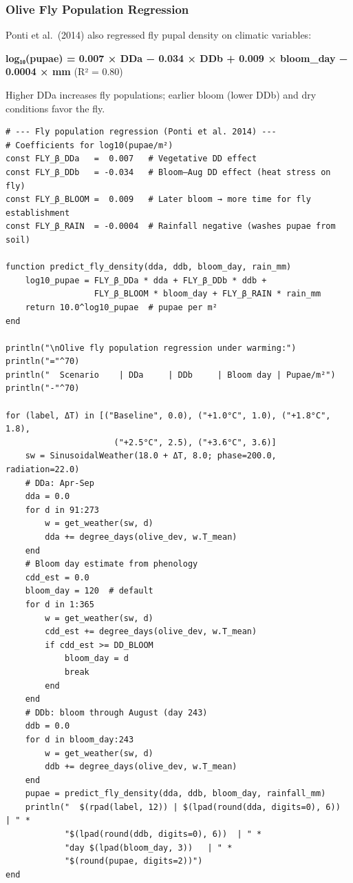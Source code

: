\subsubsection{Olive Fly Population Regression}



\label{10722401651556738282}{}


Ponti et al.~(2014) also regressed fly pupal density on climatic variables:



\textbf{log₁₀(pupae) = 0.007 × DDa − 0.034 × DDb + 0.009 × bloom\_day − 0.0004 × mm} (R² = 0.80)



Higher DDa increases fly populations; earlier bloom (lower DDb) and dry conditions favor the fly.




\begin{verbatim}
# --- Fly population regression (Ponti et al. 2014) ---
# Coefficients for log10(pupae/m²)
const FLY_β_DDa   =  0.007   # Vegetative DD effect
const FLY_β_DDb   = -0.034   # Bloom–Aug DD effect (heat stress on fly)
const FLY_β_BLOOM =  0.009   # Later bloom → more time for fly establishment
const FLY_β_RAIN  = -0.0004  # Rainfall negative (washes pupae from soil)

function predict_fly_density(dda, ddb, bloom_day, rain_mm)
    log10_pupae = FLY_β_DDa * dda + FLY_β_DDb * ddb +
                  FLY_β_BLOOM * bloom_day + FLY_β_RAIN * rain_mm
    return 10.0^log10_pupae  # pupae per m²
end

println("\nOlive fly population regression under warming:")
println("="^70)
println("  Scenario    | DDa     | DDb     | Bloom day | Pupae/m²")
println("-"^70)

for (label, ΔT) in [("Baseline", 0.0), ("+1.0°C", 1.0), ("+1.8°C", 1.8),
                      ("+2.5°C", 2.5), ("+3.6°C", 3.6)]
    sw = SinusoidalWeather(18.0 + ΔT, 8.0; phase=200.0, radiation=22.0)
    # DDa: Apr-Sep
    dda = 0.0
    for d in 91:273
        w = get_weather(sw, d)
        dda += degree_days(olive_dev, w.T_mean)
    end
    # Bloom day estimate from phenology
    cdd_est = 0.0
    bloom_day = 120  # default
    for d in 1:365
        w = get_weather(sw, d)
        cdd_est += degree_days(olive_dev, w.T_mean)
        if cdd_est >= DD_BLOOM
            bloom_day = d
            break
        end
    end
    # DDb: bloom through August (day 243)
    ddb = 0.0
    for d in bloom_day:243
        w = get_weather(sw, d)
        ddb += degree_days(olive_dev, w.T_mean)
    end
    pupae = predict_fly_density(dda, ddb, bloom_day, rainfall_mm)
    println("  $(rpad(label, 12)) | $(lpad(round(dda, digits=0), 6))  | " *
            "$(lpad(round(ddb, digits=0), 6))  | " *
            "day $(lpad(bloom_day, 3))   | " *
            "$(round(pupae, digits=2))")
end
\end{verbatim}





